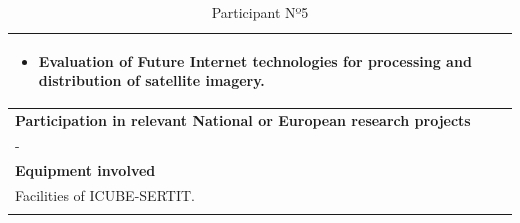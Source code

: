 \begin{longtable}[H]{|p{0.7cm}|p{4cm}|p{7cm}|p{1.3cm}|}
	\multicolumn{4}{|p{14.5cm}|}{
		\begin{itemize} 
			\item Evaluation of Future Internet technologies for processing and distribution of satellite imagery.
		\end{itemize}}  \\ \hline
	
	\multicolumn{4}{|p{13cm}|}{\textbf{Participation in relevant National or European research projects}}  \\ \hline
	
	\multicolumn{4}{|p{14.5cm}|}{-}  \\ \hline
	
	\multicolumn{4}{|p{13cm}|}{\textbf{Equipment involved}}  \\ \hline
	
	\multicolumn{4}{|p{14.5cm}|}{Facilities of ICUBE-SERTIT.}  \\ \hline
	\caption{Participant Nº5}
\end{longtable}

